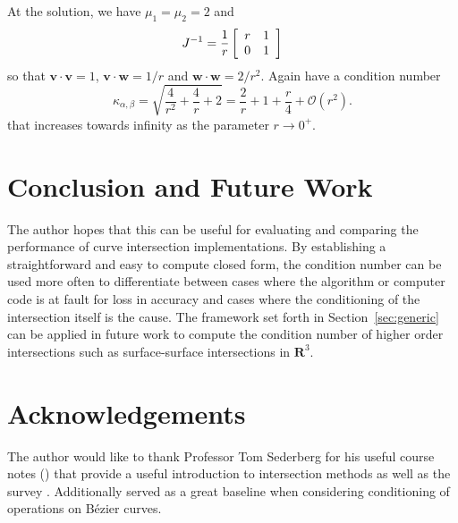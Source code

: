 \documentclass[3p, authoryear, square]{elsarticle}
\theoremstyle{definition}
\newcommand{\reals}{\mathbf{R}}
\newcommand{\bigO}[1]{\mathcal{O}\left(#1\right)}
\begin{document}
At the solution, we have \(\mu_1 = \mu_2 = 2\) and
\begin{equation}
J^{-1} = \frac{1}{r}
\left[ \begin{array}{c c} r & 1 \\ 0 & 1 \end{array}\right]
\end{equation}
so that \(\bm{v} \cdot \bm{v} = 1\), \(\bm{v} \cdot \bm{w} =
1/r\) and \(\bm{w} \cdot \bm{w} = 2/r^2\). Again have a condition number
\begin{equation}
\kappa_{\alpha, \beta} = \sqrt{\frac{4}{r^2} + \frac{4}{r} + 2} =
  \frac{2}{r} + 1 + \frac{r}{4} + \bigO{r^2}.
\end{equation}
that increases towards infinity as the parameter \(r \longrightarrow 0^+\).

\section{Conclusion and Future Work}

The author hopes that this can be useful for evaluating and comparing the
performance of curve intersection implementations. By establishing a
straightforward and easy to compute closed form, the condition number can be
used more often to differentiate between cases where the algorithm or computer
code is at fault for loss in accuracy and cases where the conditioning of the
intersection itself is the cause. The framework set forth in
Section~\ref{sec:generic} can be applied in future work to compute the
condition number of higher order intersections such as surface-surface
intersections in \(\reals^3\).

\section{Acknowledgements}

The author would like to thank Professor Tom Sederberg for his useful
course notes (\cite{SederbergNotes}) that provide a useful introduction to
intersection methods as well as the survey \cite{Sederberg1986}. Additionally
\cite{Farouki1987} served as a great baseline when considering conditioning
of operations on B\'{e}zier curves.

\section*{\refname}

\end{document}
